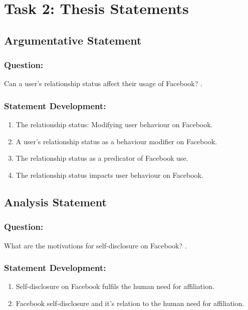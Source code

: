 \documentclass[12pt,a4paper]{report}
\begin{document}
\newpage
\section*{\textsf{Task 2: Thesis Statements}}

\subsection*{\textsf{Argumentative Statement}}

\subsubsection*{\textsf{Question:}}

Can a user's relationship status affect their usage of Facebook? \citep{McAndrew2012}.

\subsubsection*{\textsf{Statement Development:}}
\begin{enumerate}
\item The relationship status: Modifying user behaviour on Facebook.
\item A user's relationship status as a behaviour modifier on Facebook.
\item The relationship status as a predicator of Facebook use.
\item The relationship status impacts user behaviour on Facebook.
\end{enumerate}

\subsection*{\textsf{Analysis Statement}}

\subsubsection*{\textsf{Question:}}
What are the motivations for self-disclosure on Facebook? \citep{Park2011}.

\subsubsection*{\textsf{Statement Development:}}
\begin{enumerate}
\item Self-disclosure on Facebook fulfils the human need for affiliation.
\item Facebook self-disclosure and it's relation to the human need for affiliation.
\end{enumerate}
\end{document}
